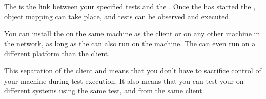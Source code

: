 The \gdagent{} is the link between your specified tests and the \gdaut{}. 
Once the \gdserver has started the \gdaut{}, object mapping can take place, and tests can be observed and executed.  

You can install the \gdserver on the same machine as the client or on any other machine in the network, as long as the \gdaut{} can also run on the machine. The \gdserver can even run on a different platform than  the client{}. 

This separation
of the client and \gdserver means that you don't have to sacrifice  control of your  machine during test execution.
It also means that you can test your \gdaut{} on different systems using the same test, and from the same client. 

